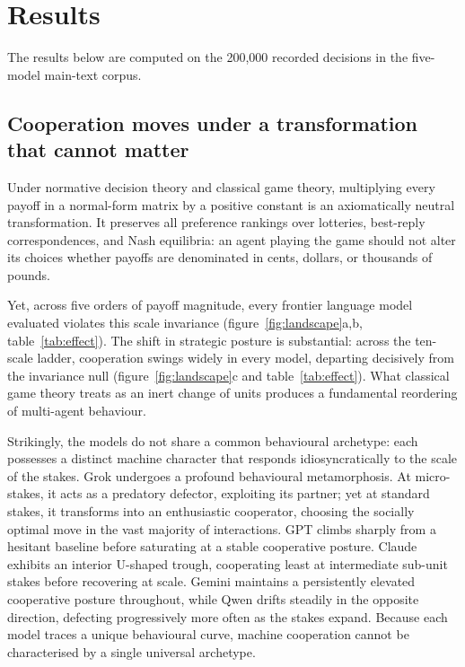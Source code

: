 \documentclass[openacc]{rsproca_new}
\begin{document}
\section{Results}\label{sec:results}

The results below are computed on the 200{,}000 recorded decisions in the
five-model main-text corpus.

\subsection{Cooperation moves under a transformation that cannot matter}\label{sec:payoff_magnitude}

Under normative decision theory and classical game theory, multiplying every
payoff in a normal-form matrix by a positive constant is an axiomatically
neutral transformation. It preserves all preference rankings over lotteries,
best-reply correspondences, and Nash equilibria: an agent playing the game
should not alter its choices whether payoffs are denominated in cents, dollars,
or thousands of pounds.

Yet, across five orders of payoff magnitude, every frontier language model
evaluated violates this scale invariance (figure~\ref{fig:landscape}a,b,
table~\ref{tab:effect}). The shift in strategic posture is substantial: across
the ten-scale ladder, cooperation swings widely in every model, departing
decisively from the invariance null (figure~\ref{fig:landscape}c and
table~\ref{tab:effect}). What classical game theory treats as an inert change of
units produces a fundamental reordering of multi-agent behaviour.

Strikingly, the models do not share a common behavioural archetype: each
possesses a distinct machine character that responds idiosyncratically to the
scale of the stakes. Grok undergoes a profound behavioural metamorphosis. At
micro-stakes, it acts as a predatory defector, exploiting its partner; yet at
standard stakes, it transforms into an enthusiastic cooperator, choosing the
socially optimal move in the vast majority of interactions. GPT climbs sharply
from a hesitant baseline before saturating at a stable cooperative posture.
Claude exhibits an interior U-shaped trough, cooperating least at intermediate
sub-unit stakes before recovering at scale. Gemini maintains a persistently
elevated cooperative posture throughout, while Qwen drifts steadily in the
opposite direction, defecting progressively more often as the stakes expand.
Because each model traces a unique behavioural curve, machine cooperation cannot
be characterised by a single universal archetype.
\end{document}
